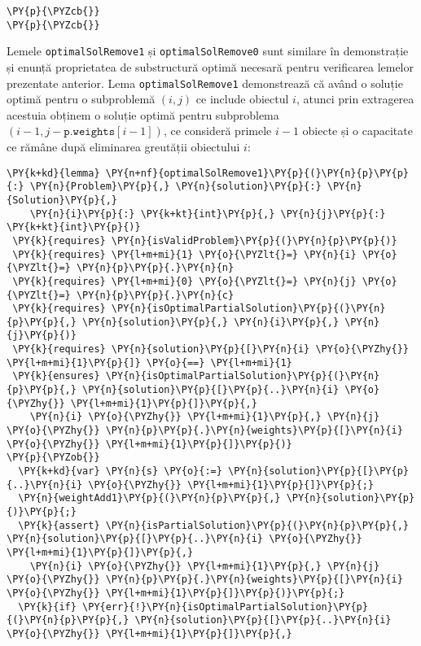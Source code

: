 \begin{sloppypar}
\begin{Verbatim}[commandchars=\\\{\}]
  \PY{p}{\PYZcb{}}
\PY{p}{\PYZcb{}}
\end{Verbatim}
\hspace{4mm} Lemele \texttt{optimalSolRemove1} și \texttt{optimalSolRemove0} sunt similare în demonstrație și enunță proprietatea de substructură optimă necesară pentru verificarea lemelor prezentate anterior. Lema \texttt{optimalSolRemove1} demonstrează că având o soluție optimă pentru o subproblemă $(i, j)$ ce include obiectul $i$, atunci prin extragerea acestuia obținem o soluție optimă pentru subproblema $(i - 1, j - \texttt{p.weights}[i - 1])$, ce consideră primele $i - 1$ obiecte și o capacitate ce rămâne după eliminarea greutății obiectului $i$:
\begin{Verbatim}[commandchars=\\\{\}]
\PY{k+kd}{lemma} \PY{n+nf}{optimalSolRemove1}\PY{p}{(}\PY{n}{p}\PY{p}{:} \PY{n}{Problem}\PY{p}{,} \PY{n}{solution}\PY{p}{:} \PY{n}{Solution}\PY{p}{,} 
    \PY{n}{i}\PY{p}{:} \PY{k+kt}{int}\PY{p}{,} \PY{n}{j}\PY{p}{:} \PY{k+kt}{int}\PY{p}{)}
 \PY{k}{requires} \PY{n}{isValidProblem}\PY{p}{(}\PY{n}{p}\PY{p}{)}
 \PY{k}{requires} \PY{l+m+mi}{1} \PY{o}{\PYZlt{}=} \PY{n}{i} \PY{o}{\PYZlt{}=} \PY{n}{p}\PY{p}{.}\PY{n}{n}
 \PY{k}{requires} \PY{l+m+mi}{0} \PY{o}{\PYZlt{}=} \PY{n}{j} \PY{o}{\PYZlt{}=} \PY{n}{p}\PY{p}{.}\PY{n}{c}
 \PY{k}{requires} \PY{n}{isOptimalPartialSolution}\PY{p}{(}\PY{n}{p}\PY{p}{,} \PY{n}{solution}\PY{p}{,} \PY{n}{i}\PY{p}{,} \PY{n}{j}\PY{p}{)}
 \PY{k}{requires} \PY{n}{solution}\PY{p}{[}\PY{n}{i} \PY{o}{\PYZhy{}} \PY{l+m+mi}{1}\PY{p}{]} \PY{o}{==} \PY{l+m+mi}{1}
 \PY{k}{ensures} \PY{n}{isOptimalPartialSolution}\PY{p}{(}\PY{n}{p}\PY{p}{,} \PY{n}{solution}\PY{p}{[}\PY{p}{..}\PY{n}{i} \PY{o}{\PYZhy{}} \PY{l+m+mi}{1}\PY{p}{]}\PY{p}{,} 
    \PY{n}{i} \PY{o}{\PYZhy{}} \PY{l+m+mi}{1}\PY{p}{,} \PY{n}{j} \PY{o}{\PYZhy{}} \PY{n}{p}\PY{p}{.}\PY{n}{weights}\PY{p}{[}\PY{n}{i} \PY{o}{\PYZhy{}} \PY{l+m+mi}{1}\PY{p}{]}\PY{p}{)}
\PY{p}{\PYZob{}}
  \PY{k+kd}{var} \PY{n}{s} \PY{o}{:=} \PY{n}{solution}\PY{p}{[}\PY{p}{..}\PY{n}{i} \PY{o}{\PYZhy{}} \PY{l+m+mi}{1}\PY{p}{]}\PY{p}{;}
  \PY{n}{weightAdd1}\PY{p}{(}\PY{n}{p}\PY{p}{,} \PY{n}{solution}\PY{p}{)}\PY{p}{;}
  \PY{k}{assert} \PY{n}{isPartialSolution}\PY{p}{(}\PY{n}{p}\PY{p}{,} \PY{n}{solution}\PY{p}{[}\PY{p}{..}\PY{n}{i} \PY{o}{\PYZhy{}} \PY{l+m+mi}{1}\PY{p}{]}\PY{p}{,} 
    \PY{n}{i} \PY{o}{\PYZhy{}} \PY{l+m+mi}{1}\PY{p}{,} \PY{n}{j} \PY{o}{\PYZhy{}} \PY{n}{p}\PY{p}{.}\PY{n}{weights}\PY{p}{[}\PY{n}{i} \PY{o}{\PYZhy{}} \PY{l+m+mi}{1}\PY{p}{]}\PY{p}{)}\PY{p}{;}
  \PY{k}{if} \PY{err}{!}\PY{n}{isOptimalPartialSolution}\PY{p}{(}\PY{n}{p}\PY{p}{,} \PY{n}{solution}\PY{p}{[}\PY{p}{..}\PY{n}{i} \PY{o}{\PYZhy{}} \PY{l+m+mi}{1}\PY{p}{]}\PY{p}{,} 

\end{Verbatim}
\end{sloppypar}
